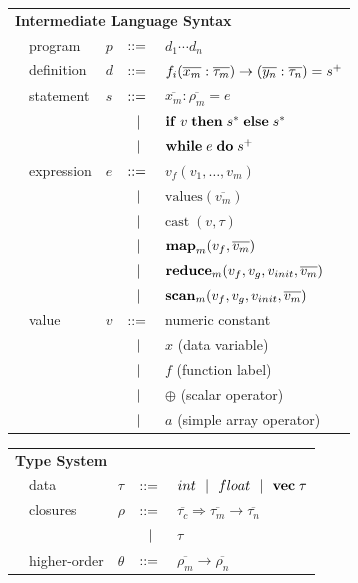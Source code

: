 \documentclass[preprint]{sigplanconf}
\begin{document}
\begin{tabular}{m{0.1cm}m{1.5cm}m{0.1cm}m{0.2cm}p{4.8cm}}
 \multicolumn{5}{l}{\textbf{Intermediate Language Syntax}}  \\[4pt]
& program & $p$ &  $::=$   &  $d_1 \cdots d_n $ \\[4pt]
& definition & $d$ & $::=$ & $f_i(\overline{x_m} : \overline{\tau_m}) \rightarrow (\overline{y_n} : \overline{\tau_n}) =s^{\small{+}}$ \\[4pt]
& statement  & $s$ & $::=$ & $\overline{x_m} : \overline{\rho_m} = e $\\[2pt]
&            &     & $\ \ | \ \ $    & $\mbox{\textbf{if}} \;v\; \mbox{\textbf{then}} \;s^*\; \mbox{\textbf{else}} \;s^*$ \\[2pt]
&            &     & $\ \ | \ \ $    & $\mbox{\textbf{while}} \;e\; \mbox{\textbf{do}} \;s^+\;  $ \\[4pt]
& expression & $e$ & $::=$ & $ v_{f}(v_1, \ldots, v_m)$ \\[2pt]
&            &     & $\ \ | \ \ $    & $\textrm{values} (\overline{v_m})$ \\[2pt]
&            &     & $\ \ | \ \ $    & $\textrm{cast} \; (v, \tau)$ \\[2pt] 
&            &     & $\ \ | \ \ $    & $\mbox{\textbf{map}}_m (v_{f},\overline{v_m})$ \\[2pt]
&            &     & $\ \ | \ \ $    & $\mbox{\textbf{reduce}}_m (v_{f}, v_{g}, v_{init}, \overline{v_m})$ \\[2pt]
&            &     & $\ \ | \ \ $    & $\mbox{\textbf{scan}}_m (v_{f}, v_{g}, v_{init}, \overline{v_m})$ \\[4pt]
& value      & $v$ & $::=$ & numeric constant\\[2pt]
&            &     & $\ \ | \ \ $    &  $x$  \quad \small{(data variable)} \\[2pt]
&            &     & $\ \ | \ \ $    &  $f$  \quad \small{(function label)} \\[2pt]
&            &     & $\ \ | \ \ $    &  $\oplus$ \quad \small{(scalar operator)} \\[2pt]
&            &     & $\ \ | \ \ $    &  $a$ \quad \small{(simple array operator)} \\[4pt]
\end{tabular}
\begin{tabular}{m{0.005cm}m{1.8cm}m{0.05cm}m{0.2cm}p{4.8cm}}
\multicolumn{5}{l}{\textbf{Type System}} \\[4pt]
& data     & $\tau$    & $::=$ & $int \ \ | \ \  float \ \ | \ \  \mathbf{vec} \; \tau   $ \\[4pt]
& closures        & $\rho$  & $::=$ & $\overline{\tau_{c}} \Rightarrow \overline{\tau_m} \rightarrow \overline{\tau_n}$\\[2pt]
&                 &           & $\ \ | \ \ $    & $\tau$ \\[4pt]
& higher-order    & $\theta$  & $::=$ & $\overline{\rho_m} \rightarrow \overline{\rho_n} $ \\[4pt]
\end{tabular}
\end{document}
